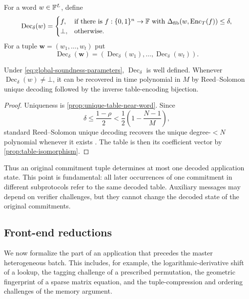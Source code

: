 \begin{definition}
\label{def:partial-table-decoder}
For a word $w\in\mathbb{F}^L$, define
\[
  \operatorname{Dec}_\delta(w)=
  \begin{cases}
    f,&\text{if there is }f:\{0,1\}^n\to\mathbb{F}\text{ with }
    \Delta_{\mathrm{fib}}(w,\operatorname{Enc}_T(f))\le\delta,\\
    \bot,&\text{otherwise.}
  \end{cases}
\]
For a tuple $\mathbf w=(w_1,\ldots,w_t)$ put
\[
  \operatorname{Dec}_\delta(\mathbf w)
  =
  (\operatorname{Dec}_\delta(w_1),\ldots,\operatorname{Dec}_\delta(w_t)).
\]
\end{definition}

\begin{lemma}
\label{lem:partial-decoder-well-defined}
Under \eqref{eq:global-soundness-parameters}, $\operatorname{Dec}_\delta$ is well defined.  Whenever $\operatorname{Dec}_\delta(w)\ne\bot$, it can be recovered in time polynomial in $M$ by Reed--Solomon unique decoding followed by the inverse table-encoding bijection.
\end{lemma}

\begin{proof}
Uniqueness is \cref{prop:unique-table-near-word}.  Since
\[
  \delta\le\frac{1-\rho}{2}
  <\frac12\left(1-\frac{N-1}{M}\right),
\]
standard Reed--Solomon unique decoding recovers the unique degree-$<N$ polynomial whenever it exists \cite{WelchBerlekamp86,Gao03}.  The table is then its coefficient vector by \cref{prop:table-isomorphism}.
\end{proof}

Thus an original commitment tuple determines at most one decoded application state.  This point is fundamental: all later occurrences of one commitment in different subprotocols refer to the same decoded table.  Auxiliary messages may depend on verifier challenges, but they cannot change the decoded state of the original commitments.

\subsection{Front-end reductions}
\label{sec:front-end-reductions}

We now formalize the part of an application that precedes the master heterogeneous batch.  This includes, for example, the logarithmic-derivative shift of a lookup, the tagging challenge of a prescribed permutation, the geometric fingerprint of a sparse matrix equation, and the tuple-compression and ordering challenges of the memory argument.

